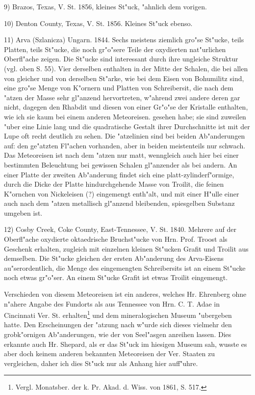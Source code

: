 \documentclass[a4paper, 11pt, oneside, german]{article}
\begin{document}
9) Brazos, Texas, V. St. 1856, kleines St"uck, "ahnlich dem vorigen.

10) Denton County, Texas, V. St. 1856. Kleines St"uck ebenso.

11) Arva (Szlanicza) Ungarn. 1844. Sechs meistens ziemlich gro"se St"ucke, teils Platten, teils St"ucke, die noch gr"o"sere Teile der oxydierten nat"urlichen Oberfl"ache zeigen. Die St"ucke sind interessant durch ihre ungleiche Struktur (vgl. oben S. 55). Vier derselben enthalten in der Mitte der Schalen, die bei allen von gleicher und von derselben St"arke, wie bei dem Eisen von Bohumilitz sind, eine gro"se Menge von K"ornern und Platten von Schreibersit, die nach dem "atzen der Masse sehr gl"anzend hervortreten, w"ahrend zwei andere deren gar nicht, dagegen den Rhabdit und diesen von einer Gr"o"se der Kristalle enthalten, wie ich sie kaum bei einem anderen Meteoreisen. gesehen habe; sie sind zuweilen "uber eine Linie lang und die quadratische Gestalt ihrer Durchschnitte ist mit der Lupe oft recht deutlich zu sehen. Die "atzelinien sind bei beiden Ab"anderungen auf: den ge"atzten Fl"achen vorhanden, aber in beiden meistenteils nur schwach. Das Meteoreisen ist nach dem "atzen nur matt, wenngleich auch hier bei einer bestimmten Beleuchtung bei gewissen Schalen gl"anzender als bei andern. An einer Platte der zweiten Ab"anderung findet sich eine platt-zylinderf"ormige, durch die Dicke der Platte hindurchgehende Masse von Troilit, die feinen K"ornchen von Nickeleisen (?) eingemengt enth"alt, und mit einer H"ulle einer auch nach dem "atzen metallisch gl"anzend bleibenden, spiesgelben Substanz umgeben ist.

12) Cosby Creek, Coke County, East-Tennessee, V. St. 1840. Mehrere auf der Oberfl"ache oxydierte oktaedrische Bruchst"ucke von Hrn. Prof. Troost als Geschenk erhalten, zugleich mit einzelnen kleinen St"ucken Grafit und Troilit aus demselben. Die St"ucke gleichen der ersten Ab"anderung des Arva-Eisens au"serordentlich, die Menge des eingemengten Schreibersits ist an einem St"ucke noch etwas gr"o"ser. An einem St"ucke Grafit ist etwas Troilit eingemengt.

Verschieden von diesem Meteoreisen ist ein anderes, welches Hr. Ehrenberg ohne n"ahere Angabe des Fundorts als aus Tennessee von Hrn. C. T. Adae in Cincinnati Ver. St. erhalten\footnote{Vergl. Monatsber. der k. Pr. Akad. d. Wiss. von 1861, S. 517.} und dem mineralogischen Museum "ubergeben hatte. Den Erscheinungen der "atzung nach w"urde sich dieses vielmehr den grobk"ornigen Ab"anderungen, wie der von Seel"asgen anreihen lassen. Dies erkannte auch Hr. Shepard, als er das St"uck im hiesigen Museum sah, wusste es aber doch keinem anderen bekannten Meteoreisen der Ver. Staaten zu vergleichen, daher ich dies St"uck nur als Anhang hier auff"uhre.
\end{document}
